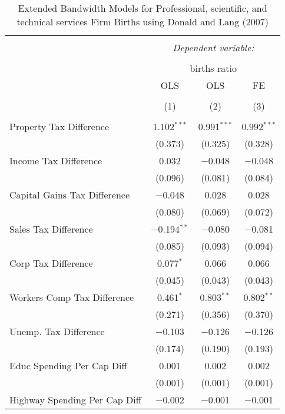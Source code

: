 
\begin{table}[!htbp] \centering 
  \caption{Extended Bandwidth Models for  Professional, scientific, and technical services Firm Births using Donald and Lang (2007)} 
  \label{} 
\begin{tabular}{@{\extracolsep{5pt}}lccc} 
\\[-1.8ex]\hline 
\hline \\[-1.8ex] 
 & \multicolumn{3}{c}{\textit{Dependent variable:}} \\ 
\cline{2-4} 
\\[-1.8ex] & \multicolumn{3}{c}{births ratio} \\ 
 & OLS & OLS & FE \\ 
\\[-1.8ex] & (1) & (2) & (3)\\ 
\hline \\[-1.8ex] 
 Property Tax Difference & 1.102$^{***}$ & 0.991$^{***}$ & 0.992$^{***}$ \\ 
  & (0.373) & (0.325) & (0.328) \\ 
  Income Tax Difference & 0.032 & $-$0.048 & $-$0.048 \\ 
  & (0.096) & (0.081) & (0.084) \\ 
  Capital Gains Tax Difference & $-$0.048 & 0.028 & 0.028 \\ 
  & (0.080) & (0.069) & (0.072) \\ 
  Sales Tax Difference & $-$0.194$^{**}$ & $-$0.080 & $-$0.081 \\ 
  & (0.085) & (0.093) & (0.094) \\ 
  Corp Tax Difference & 0.077$^{*}$ & 0.066 & 0.066 \\ 
  & (0.045) & (0.043) & (0.043) \\ 
  Workers Comp Tax Difference & 0.461$^{*}$ & 0.803$^{**}$ & 0.802$^{**}$ \\ 
  & (0.271) & (0.356) & (0.370) \\ 
  Unemp. Tax Difference & $-$0.103 & $-$0.126 & $-$0.126 \\ 
  & (0.174) & (0.190) & (0.193) \\ 
  Educ Spending Per Cap Diff & 0.001 & 0.002 & 0.002 \\ 
  & (0.001) & (0.001) & (0.001) \\ 
  Highway Spending Per Cap Diff & $-$0.002 & $-$0.001 & $-$0.001 \\ 

\end{tabular}
\end{table}
